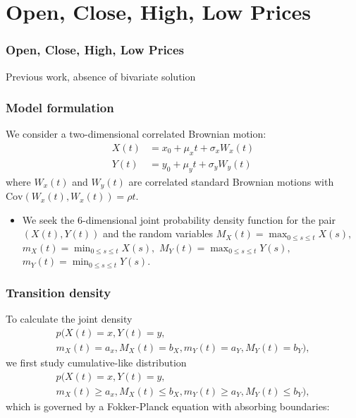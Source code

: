 \documentclass{beamer}
\begin{document}
\section{Open, Close, High, Low Prices}
\begin{frame}
  \frametitle{Open, Close, High, Low Prices}
  Previous work, absence of bivariate solution
\end{frame}
\begin{frame}
  \frametitle{Model formulation}
  We consider a two-dimensional correlated Brownian motion:
\begin{align}
  X(t) &= x_0 + \mu_x t + \sigma_x W_x(t)  \label{eq:X} \\
  Y(t) &= y_0 + \mu_y t + \sigma_y W_y(t)  \label{eq:Y}
\end{align}
where $W_x(t)$ and $W_y(t)$ are correlated standard Brownian motions
with $\mbox{Cov}(W_x(t), W_x(t)) = \rho t$.

\begin{itemize}
\item We seek the 6-dimensional joint probability density
function for the pair $(X(t), Y(t))$ and the random variables
$M_X(t)=\max_{0\leq s\leq t}X(s),$ $m_X(t)=\min_{0\leq s\leq t}X(s),$
$M_Y(t)=\max_{0\leq s\leq t}Y(s),$ $m_Y(t)=\min_{0\leq s\leq t}Y(s)$.
\end{itemize}
\end{frame}
\begin{frame}
  \frametitle{Transition density} To calculate the joint density
  \begin{multline*}
    p(X(t) = x, Y(t) = y, \\
    m_X(t) = a_x, M_X(t) = b_X, m_Y(t) = a_Y, M_Y(t) = b_Y),
  \end{multline*}
  we first study cumulative-like distribution
  \begin{multline*}
    p(X(t) = x, Y(t) = y, \\
    m_X(t) \geq a_x, M_X(t) \leq b_X, m_Y(t) \geq
    a_Y, M_Y(t) \leq b_Y),
  \end{multline*}
  which is governed by a Fokker-Planck equation with absorbing boundaries:
\end{frame}
\end{document}
